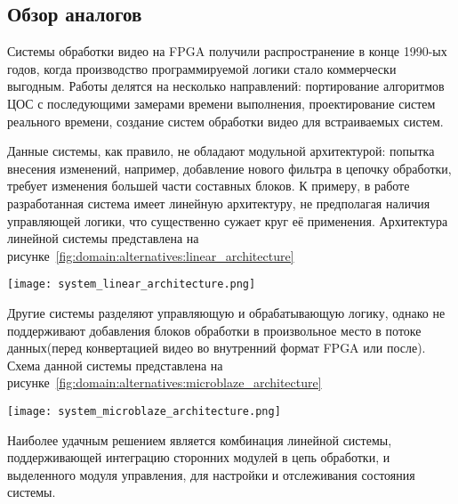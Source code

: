 \subsection{Обзор аналогов}
\label{sub:domain:alternatives}

Системы обработки видео на FPGA получили распространение в конце 1990-ых годов, когда
производство программируемой логики стало коммерчески выгодным. Работы делятся на несколько
направлений: портирование алгоритмов ЦОС с последующими замерами времени выполнения,
проектирование систем реального времени, создание систем обработки видео для встраиваемых систем.

Данные системы, как правило, не обладают модульной архитектурой: попытка внесения изменений,
например, добавление нового фильтра в цепочку обработки, требует изменения большей части
составных блоков.
К примеру, в работе \cite{meng_fpga_based_video_processing} разработанная система
имеет линейную архитектуру, не предполагая наличия управляющей логики, что существенно сужает круг
её применения. Архитектура линейной системы представлена на рисунке~\ref{fig:domain:alternatives:linear_architecture}

\begin{center}
  \centering
  \texttt{[image: system\_linear\_architecture.png]}
  \label{fig:domain:alternatives:linear_architecture}
\end{center}

Другие системы \cite{embeded_real_time_fpga_modular} разделяют управляющую
и обрабатывающую логику, однако не поддерживают добавления блоков обработки в произвольное
место в потоке данных(перед конвертацией видео во внутренний формат FPGA или после).
Схема данной системы представлена на рисунке~\ref{fig:domain:alternatives:microblaze_architecture}

\begin{center}
  \centering
  \texttt{[image: system\_microblaze\_architecture.png]}
  \label{fig:domain:alternatives:microblaze_architecture}
\end{center}

Наиболее удачным решением является комбинация линейной системы, поддерживающей интеграцию сторонних модулей в цепь обработки, и
выделенного модуля управления, для настройки и отслеживания состояния системы.
